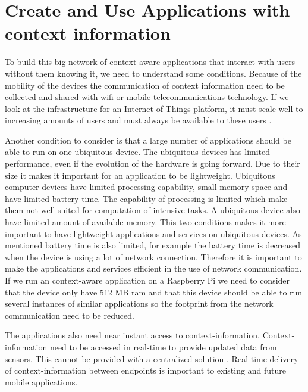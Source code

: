 \section{Create and Use Applications with context information}
To build this big network of context aware applications that interact with users without them knowing it, we need to understand some conditions. Because of the mobility of the devices the communication of context information need to be collected and shared with wifi or mobile telecommunications technology. If we look at the infrastructure for an Internet of Things platform, it must scale well to increasing amounts of users and must always be available to these users \cite{Kanter539187}.

Another condition to consider is that a large number of applications should be able to run on one ubiquitous device. The ubiquitous devices has limited performance, even if the evolution of the hardware is going forward. Due to their size it makes it important for an application to be lightweight. Ubiquitous computer devices have limited processing capability, small memory space and have limited battery time. The capability of processing is limited which make them not well suited for computation of intensive tasks. A ubiquitous device also have limited amount of available memory. This two conditions makes it more important to have lightweight applications and services on ubiquitous devices. As mentioned battery time is also limited, for example the battery time is decreased when the device is using a lot of network connection. Therefore it is important to make the applications and services efficient in the use of network communication. 
If we run an context-aware application on a Raspberry Pi we need to consider that the device only have 512 MB ram and that this device should be able to run several instances of similar applications so the footprint from the network communication need to be reduced. 

The applications also need near instant access to context-information. Context-information need to be accessed in real-time to provide updated data from sensors. This cannot be provided with a centralized solution \cite{TheMediaSenseFramework}. Real-time delivery of context-information between endpoints is important to existing and future mobile applications. 
